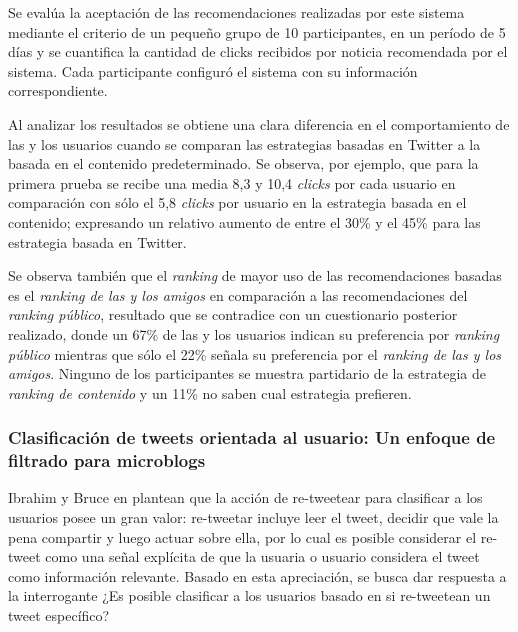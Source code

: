    Se evalúa la aceptación de las recomendaciones realizadas por este sistema mediante el criterio de un pequeño grupo de 10 participantes, en un período de 5 días y se cuantifica la cantidad de clicks recibidos por noticia recomendada por el sistema. Cada participante configuró el sistema con su información correspondiente.

	Al analizar los resultados se obtiene una clara diferencia en el comportamiento de las y los usuarios cuando se comparan las estrategias basadas en Twitter a la basada en el contenido predeterminado. Se observa, por ejemplo, que para la primera prueba se recibe una media 8,3 y 10,4 \emph{clicks} por cada usuario en comparación con sólo el 5,8 \emph{clicks} por usuario en la estrategia basada en el contenido; expresando un relativo aumento de entre el 30\% y el 45\% para las estrategia basada en Twitter.

	Se observa también que el \emph{ranking} de mayor uso de las recomendaciones basadas es el \emph{ranking de las y los amigos} en comparación a las recomendaciones del \emph{ranking público}, resultado que se contradice con un cuestionario posterior realizado, donde un 67\% de las y los usuarios indican su preferencia por \emph{ranking público} mientras que sólo el 22\% señala su preferencia por el \emph{ranking de las y los amigos}. Ninguno de los participantes se muestra partidario de la estrategia de \emph{ranking de contenido} y un 11\% no saben cual estrategia prefieren.

\subsubsection{Clasificación de tweets orientada al usuario: Un enfoque de filtrado para microblogs}


Ibrahim y Bruce en \cite{conf/cikm/UysalC11} plantean que la acción de re-tweetear para clasificar a los usuarios posee un gran valor: re-tweetar incluye leer el tweet, decidir que vale la pena compartir y luego actuar sobre ella, por lo cual es posible considerar el re-tweet como una señal explícita de que la usuaria o usuario considera el tweet como información relevante. Basado en esta apreciación, se busca dar respuesta a la interrogante  ¿Es posible clasificar a los usuarios basado en si re-tweetean un tweet específico?

